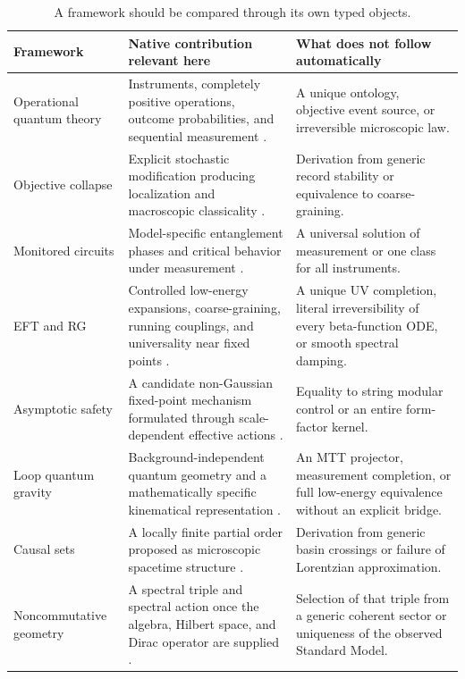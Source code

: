 \documentclass[11pt]{article}
\theoremstyle{definition}
\theoremstyle{remark}
\begin{document}
\begin{table}[htbp]
\centering
\scriptsize
\renewcommand{\arraystretch}{1.18}
\begin{tabularx}{\textwidth}{@{}P{0.17\textwidth}Y Y@{}}
\toprule
Framework & Native contribution relevant here & What does not follow automatically \\
\midrule
Operational quantum theory &
Instruments, completely positive operations, outcome probabilities, and
sequential measurement \cite{DaviesLewis1970}. &
A unique ontology, objective event source, or irreversible microscopic law. \\

Objective collapse &
Explicit stochastic modification producing localization and macroscopic
classicality \cite{GRW1986}. &
Derivation from generic record stability or equivalence to coarse-graining. \\

Monitored circuits &
Model-specific entanglement phases and critical behavior under measurement
\cite{SkinnerRuhmanNahum2019}. &
A universal solution of measurement or one class for all instruments. \\

EFT and RG &
Controlled low-energy expansions, coarse-graining, running couplings, and
universality near fixed points \cite{WilsonKogut1974,Polchinski1984}. &
A unique UV completion, literal irreversibility of every beta-function ODE, or
smooth spectral damping. \\

Asymptotic safety &
A candidate non-Gaussian fixed-point mechanism formulated through
scale-dependent effective actions \cite{Reuter1998}. &
Equality to string modular control or an entire form-factor kernel. \\

Loop quantum gravity &
Background-independent quantum geometry and a mathematically specific
kinematical representation \cite{AshtekarLewandowski2004}. &
An MTT projector, measurement completion, or full low-energy equivalence without
an explicit bridge. \\

Causal sets &
A locally finite partial order proposed as microscopic spacetime structure
\cite{BombelliEtAl1987}. &
Derivation from generic basin crossings or failure of Lorentzian approximation. \\

Noncommutative geometry &
A spectral triple and spectral action once the algebra, Hilbert space, and
Dirac operator are supplied \cite{ChamseddineConnes1997}. &
Selection of that triple from a generic coherent sector or uniqueness of the
observed Standard Model. \\
\bottomrule
\end{tabularx}
\caption{A framework should be compared through its own typed objects.}
\label{tab:frameworks}
\end{table}
\end{document}
